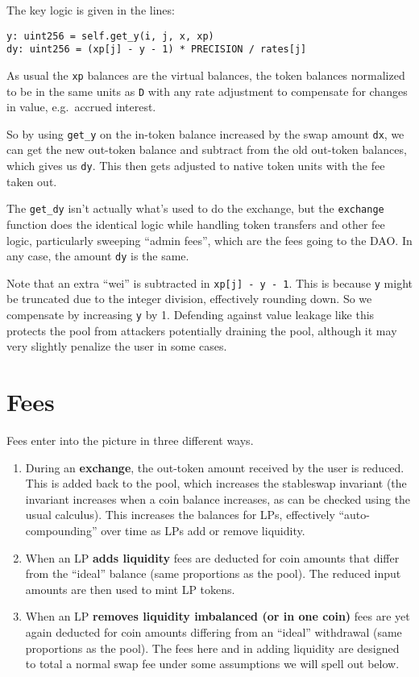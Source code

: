 \documentclass[
]{article}
\begin{document}
The key logic is given in the lines:

\begin{verbatim}
y: uint256 = self.get_y(i, j, x, xp)
dy: uint256 = (xp[j] - y - 1) * PRECISION / rates[j]
\end{verbatim}

As usual the \texttt{xp} balances are the virtual balances, the token
balances normalized to be in the same units as \texttt{D} with any rate
adjustment to compensate for changes in value, e.g.~accrued interest.

So by using \texttt{get\_y} on the in-token balance increased by the
swap amount \texttt{dx}, we can get the new out-token balance and
subtract from the old out-token balances, which gives us \texttt{dy}.
This then gets adjusted to native token units with the fee taken out.

The \texttt{get\_dy} isn't actually what's used to do the exchange, but
the \texttt{exchange} function does the identical logic while handling
token transfers and other fee logic, particularly sweeping ``admin
fees'', which are the fees going to the DAO. In any case, the amount
\texttt{dy} is the same.

Note that an extra ``wei'' is subtracted in
\texttt{xp{[}j{]}\ -\ y\ -\ 1}. This is because \texttt{y} might be
truncated due to the integer division, effectively rounding down. So we
compensate by increasing \texttt{y} by 1. Defending against value
leakage like this protects the pool from attackers potentially draining
the pool, although it may very slightly penalize the user in some cases.

\hypertarget{fees}{%
\section{Fees}\label{fees}}

Fees enter into the picture in three different ways.

\begin{enumerate}
\def\labelenumi{\arabic{enumi})}
\item
  During an \textbf{exchange}, the out-token amount received by the user
  is reduced. This is added back to the pool, which increases the
  stableswap invariant (the invariant increases when a coin balance
  increases, as can be checked using the usual calculus). This increases
  the balances for LPs, effectively ``auto-compounding'' over time as
  LPs add or remove liquidity.
\item
  When an LP \textbf{adds liquidity} fees are deducted for coin amounts
  that differ from the ``ideal'' balance (same proportions as the pool).
  The reduced input amounts are then used to mint LP tokens.
\item
  When an LP \textbf{removes liquidity imbalanced (or in one coin)} fees
  are yet again deducted for coin amounts differing from an ``ideal''
  withdrawal (same proportions as the pool). The fees here and in adding
  liquidity are designed to total a normal swap fee under some
  assumptions we will spell out below.
\end{enumerate}
\end{document}
